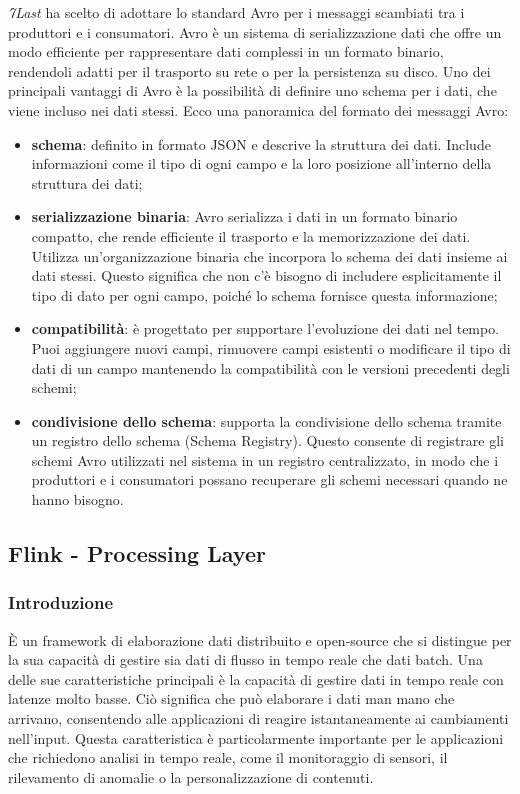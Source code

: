 \textit{7Last} ha scelto di adottare lo standard Avro per i messaggi scambiati tra i produttori e i consumatori. Avro è un sistema di serializzazione dati che offre un modo efficiente per rappresentare dati complessi in un formato binario, rendendoli adatti per il trasporto su rete o per la persistenza su disco. Uno dei principali vantaggi di Avro è la possibilità di definire uno schema per i dati, che viene incluso nei dati stessi. Ecco una panoramica del formato dei messaggi Avro:
\begin{itemize}
	\item \textbf{schema}: definito in formato JSON e descrive la struttura dei dati. Include informazioni come il tipo di ogni campo e la loro posizione all'interno della struttura dei dati;
	\item \textbf{serializzazione binaria}: Avro serializza i dati in un formato binario compatto, che rende efficiente il trasporto e la memorizzazione dei dati. Utilizza un'organizzazione binaria che incorpora lo schema dei dati insieme ai dati stessi. Questo significa che non c'è bisogno di includere esplicitamente il tipo di dato per ogni campo, poiché lo schema fornisce questa informazione;
	\item \textbf{compatibilità}: è progettato per supportare l'evoluzione dei dati nel tempo. Puoi aggiungere nuovi campi, rimuovere campi esistenti o modificare il tipo di dati di un campo mantenendo la compatibilità con le versioni precedenti degli schemi;
	\item \textbf{condivisione dello schema}: supporta la condivisione dello schema tramite un registro dello schema (Schema Registry). Questo consente di registrare gli schemi Avro utilizzati nel sistema in un registro centralizzato, in modo che i produttori e i consumatori possano recuperare gli schemi necessari quando ne hanno bisogno.
\end{itemize}

\subsection{Flink - Processing Layer}
\subsubsection{Introduzione}
È un framework di elaborazione dati distribuito e open-source che si distingue per la sua capacità di gestire sia dati di flusso in tempo reale che dati batch. Una delle sue caratteristiche principali è la capacità di gestire dati in tempo reale con latenze molto basse. Ciò significa che può elaborare i dati man mano che arrivano, consentendo alle applicazioni di reagire istantaneamente ai cambiamenti nell'input. Questa caratteristica è particolarmente importante per le applicazioni che richiedono analisi in tempo reale, come il monitoraggio di sensori, il rilevamento di anomalie o la personalizzazione di contenuti.
